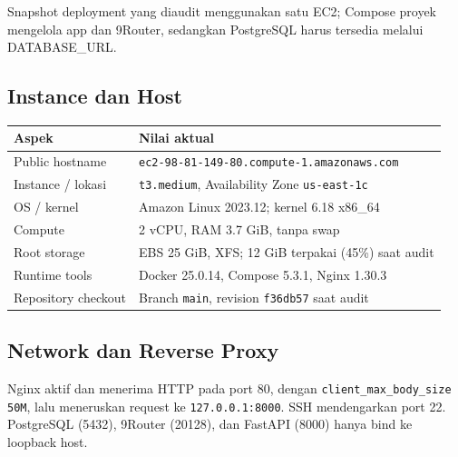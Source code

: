 \documentclass[11pt,a4paper]{article}
\begin{document}
\begin{center}
{%
}
\end{center}
\begin{center}\small\color{Muted}Snapshot deployment yang diaudit menggunakan satu EC2; Compose proyek mengelola app dan 9Router, sedangkan PostgreSQL harus tersedia melalui DATABASE\_URL.\end{center}

\subsection{Instance dan Host}
\begin{tabularx}{\linewidth}{@{}p{4.5cm}X@{}}
\toprule \textbf{Aspek} & \textbf{Nilai aktual} \\ \midrule
Public hostname & \texttt{ec2-98-81-149-80.}\linebreak\texttt{compute-1.amazonaws.com} \\
Instance / lokasi & \texttt{t3.medium}, Availability Zone \texttt{us-east-1c} \\
OS / kernel & Amazon Linux 2023.12; kernel 6.18 x86\_64 \\
Compute & 2 vCPU, RAM 3.7 GiB, tanpa swap \\
Root storage & EBS 25 GiB, XFS; 12 GiB terpakai (45\%) saat audit \\
Runtime tools & Docker 25.0.14, Compose 5.3.1, Nginx 1.30.3 \\
Repository checkout & Branch \texttt{main}, revision \texttt{f36db57} saat audit \\
\bottomrule
\end{tabularx}

\subsection{Network dan Reverse Proxy}
Nginx aktif dan menerima HTTP pada port 80, dengan \texttt{client\_max\_body\_size 50M}, lalu meneruskan request ke \texttt{127.0.0.1:8000}. SSH mendengarkan port 22. PostgreSQL (5432), 9Router (20128), dan FastAPI (8000) hanya bind ke loopback host.
\end{document}
